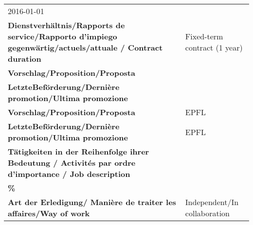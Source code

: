 \documentclass[
]{article}
\begin{document}
\begin{longtable}[]{@{}ll@{}}
\begin{minipage}[t]{0.49\columnwidth}
2016-01-01\strut
\end{minipage}\tabularnewline
\begin{minipage}[t]{0.45\columnwidth}\raggedright
\textbf{Dienstverhältnis/Rapports de service/Rapporto d'impiego
gegenwärtig/actuels/attuale / Contract duration}\strut
\end{minipage} & \begin{minipage}[t]{0.49\columnwidth}\raggedright
Fixed-term contract (1 year)\strut
\end{minipage}\tabularnewline
\begin{minipage}[t]{0.45\columnwidth}\raggedright
\textbf{Vorschlag/Proposition/Proposta}\strut
\end{minipage} & \begin{minipage}[t]{0.49\columnwidth}\raggedright
\strut
\end{minipage}\tabularnewline
\begin{minipage}[t]{0.45\columnwidth}\raggedright
\textbf{LetzteBeförderung/Dernière promotion/Ultima promozione}\strut
\end{minipage} & \begin{minipage}[t]{0.49\columnwidth}\raggedright
\strut
\end{minipage}\tabularnewline
\begin{minipage}[t]{0.45\columnwidth}\raggedright
\textbf{Vorschlag/Proposition/Proposta}\strut
\end{minipage} & \begin{minipage}[t]{0.49\columnwidth}\raggedright
EPFL\strut
\end{minipage}\tabularnewline
\begin{minipage}[t]{0.45\columnwidth}\raggedright
\textbf{LetzteBeförderung/Dernière promotion/Ultima promozione}\strut
\end{minipage} & \begin{minipage}[t]{0.49\columnwidth}\raggedright
EPFL\strut
\end{minipage}\tabularnewline
\begin{minipage}[t]{0.45\columnwidth}\raggedright
\textbf{Tätigkeiten in der Reihenfolge ihrer Bedeutung / Activités par
ordre d'importance / Job description}\strut
\end{minipage} & \begin{minipage}[t]{0.49\columnwidth}\raggedright
\strut
\end{minipage}\tabularnewline
\begin{minipage}[t]{0.45\columnwidth}\raggedright
\textbf{\%}\strut
\end{minipage} & \begin{minipage}[t]{0.49\columnwidth}\raggedright
\strut
\end{minipage}\tabularnewline
\begin{minipage}[t]{0.45\columnwidth}\raggedright
\textbf{Art der Erledigung/ Manière de traiter les affaires/Way of
work}\strut
\end{minipage} & \begin{minipage}[t]{0.49\columnwidth}\raggedright
Independent/In collaboration\strut
\end{minipage}\tabularnewline
\bottomrule
\end{longtable}
\end{document}
